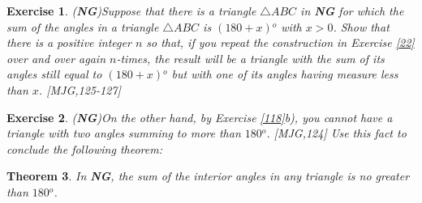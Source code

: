 \documentclass{article}%
\providecommand{\U}[1]{\protect\rule{.1in}{.1in}}
\newtheorem{theorem}{Theorem}
\newtheorem{exercise}[theorem]{Exercise}
\begin{document}
\begin{exercise}
(\textbf{NG})\label{121} Suppose that there is a triangle $\triangle ABC$ in
\textbf{NG} for which the sum of the angles in a triangle $\triangle ABC$ is
$\left(  180+x\right)
{{}^o}%
$ with $x>0$. Show that there is a positive integer $n$ so that, if you repeat
the construction in Exercise \ref{22} over and over again $n$-times, the
result will be a triangle with the sum of its angles still equal to $\left(
180+x\right)
{{}^o}%
$ but with one of its angles having measure less than $x$. [MJG,125-127]
\end{exercise}

\begin{exercise}
(\textbf{NG})\label{122} On the other hand, by Exercise \ref{118}b), you
cannot have a triangle with two angles summing to more than $180%
{{}^o}%
$. [MJG,124] Use this fact to conclude the following theorem:
\end{exercise}

\begin{theorem}
In \textbf{NG}, the sum of the interior angles in any triangle is no greater
than $180%
{{}^o}%
$.
\end{theorem}
\end{document}
